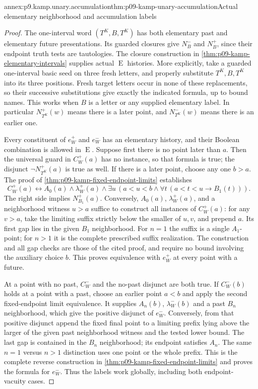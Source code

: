 \begin{annexitem}{annex:p9.kamp.unary.accumulation}{thm:p09-kamp-unary-accumulation}{Actual elementary neighborhood and accumulation labels}
\begin{proof}
The one-interval word \((T^K,B,T^K)\) has both elementary
past and elementary future presentations. Its guarded closures give
\(N_B^-\) and \(N_B^+\), since their endpoint truth tests
are tautologies. The closure construction in
\cref{thm:p09-kamp-elementary-intervals} supplies actual
\(\operatorname{E}\) histories. More explicitly, take a
guarded one-interval basic seed on three fresh letters, and properly
substitute \(T^K,B,T^K\) into its three positions. Fresh target
letters occur in none of these replacements, so their successive
substitutions give exactly the indicated formula, up to bound names.
This works when \(B\) is a letter or any supplied elementary label.
In particular \(N_{T^K}^+(w)\) means there is a later point,
and \(N_{T^K}^-(w)\) means there is an earlier one.

Every constituent of \(e_W^+\) and \(e_W^-\) has an
elementary history, and their Boolean combination is allowed in
\(\operatorname{E}\). Suppose first there is no point later
than \(a\). Then the universal guard in \(C_W^+(a)\)
has no instance, so that formula is true; the disjunct
\(\neg N_{T^K}^+(a)\) is true as well.
If there is a later point, choose any one \(b>a\).
The proof of \cref{thm:p09-kamp-fixed-endpoint-limits} establishes
\[
 C_W^+(a)\longleftrightarrow
 A_0(a)\land\lambda_W^+(a)\land
 \exists u\,(a<u<b\land\forall t\,(a<t<u\to B_1(t))).
 \tag{1}
\]
The right side implies \(N_{B_1}^+(a)\).
Conversely, \(A_0(a)\), \(\lambda_W^+(a)\), and a
neighborhood witness \(u>a\) suffice to construct all instances
of \(C_W^+(a)\): for any \(v>a\), take the limiting
suffix strictly below the smaller of \(u,v\), and prepend
\(a\). Its first gap lies in the given \(B_1\) neighborhood.
For \(n=1\) the suffix is a single \(A_1\)-point; for
\(n>1\) it is the complete prescribed suffix realization.
The construction and all gap checks are those of the cited proof,
and require no bound involving the auxiliary choice \(b\).
This proves equivalence with \(e_W^+\) at every point with a future.

At a point with no past, \(C_W^-\) and the no-past disjunct
are both true. If \(C_W^-(b)\) holds at a point with a past,
choose an earlier point \(a<b\) and apply the second fixed-endpoint
limit equivalence. It supplies \(A_n(b)\), \(\lambda_W^-(b)\)
and a past \(B_n\) neighborhood, which give the positive disjunct
of \(e_W^-\). Conversely, from that positive disjunct append the fixed final point
to a limiting prefix lying above the larger of the given past
neighborhood witness and the tested lower bound. The last gap is
contained in the \(B_n\) neighborhood; its endpoint satisfies
\(A_n\). The same \(n=1\) versus \(n>1\) distinction
uses one point or the whole prefix. This is the complete reverse
construction in \cref{thm:p09-kamp-fixed-endpoint-limits} and
proves the formula for \(e_W^-\). Thus the labels work globally,
including both endpoint-vacuity cases.
\end{proof}
\end{annexitem}

